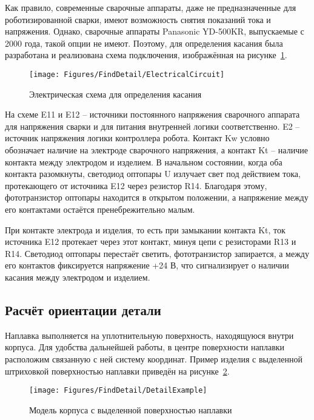 Как правило, современные сварочные аппараты, даже не предназначенные для роботизированной сварки, имеют возможность снятия показаний тока и напряжения.
Однако, сварочные аппараты Panasonic YD-500KR, выпускаемые с 2000 года, такой опции не имеют.
Поэтому, для определения касания была разработана и реализована схема подключения, изображённая на рисунке~\ref{fig:FindDetail:ElectricalCircuit}.

\begin{figure}[H]
    \centering
    \vspace{14pt}
    \texttt{[image: Figures/FindDetail/ElectricalCircuit]}
    \caption{Электрическая схема для определения касания}
    \label{fig:FindDetail:ElectricalCircuit}
\end{figure}

На схеме E11 и E12 -- источники постоянного напряжения сварочного аппарата для напряжения сварки и для питания внутренней логики соответственно.
E2 -- источник напряжения логики контроллера робота.
Контакт Kw условно обозначает наличие на электроде сварочного напряжения, а контакт Kt -- наличие контакта между электродом и изделием.
В начальном состоянии, когда оба контакта разомкнуты, светодиод оптопары U излучает свет под действием тока, протекающего от источника E12 через резистор R14.
Благодаря этому, фототранзистор оптопары находится в открытом положении, а напряжение между его контактами остаётся пренебрежительно малым.

При контакте электрода и изделия, то есть при замыкании контакта Kt, ток источника E12 протекает через этот контакт, минуя цепи с резисторами R13 и R14.
Светодиод оптопары перестаёт светить, фототранзистор запирается, а между его контактов фиксируется напряжение +24 В, что сигнализирует о наличии касания между электродом и изделием.

\subsection{Расчёт ориентации детали} \label{subsec:DetailOrientation}
Наплавка выполняется на уплотнительную поверхность, находящуюся внутри корпуса.
Для удобства дальнейшей работы, в центре поверхности наплавки расположим связанную с ней систему координат.
Пример изделия с выделенной штриховкой поверхностью наплавки приведён на рисунке~\ref{fig:FindDetail:ValveExample}.

\begin{figure}[H]
    \centering
    \vspace{14pt}
    \texttt{[image: Figures/FindDetail/DetailExample]}
    \caption{Модель корпуса с выделенной поверхностью наплавки}
    \label{fig:FindDetail:ValveExample}
\end{figure}


